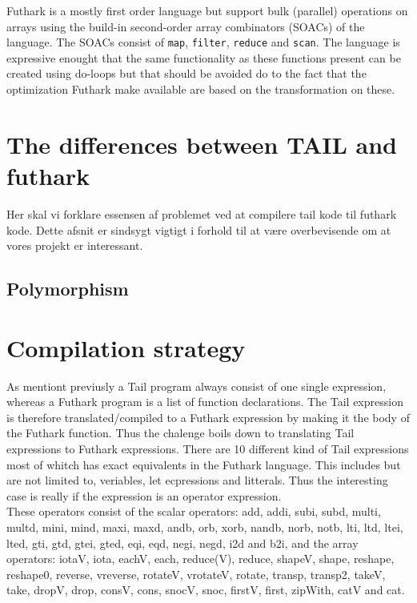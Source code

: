 \documentclass[11pt]{article}
\begin{document}
Futhark is a mostly first order language but support bulk (parallel) operations on arrays using the build-in second-order array combinators (SOACs) of the language. The SOACs consist of {\tt map}, {\tt filter}, {\tt reduce} and {\tt scan}. The language is expressive enought that the same functionality as these functions present can be created using do-loops but that should be avoided do to the fact that the optimization Futhark make available are based on the transformation on these.



\section{The differences between TAIL and futhark}

Her skal vi forklare essensen af problemet ved at compilere tail kode til futhark kode. Dette afsnit er sindsygt vigtigt i forhold til at være overbevisende om at vores projekt er interessant. 

\subsection{Polymorphism}

\section{Compilation strategy}
As mentiont previusly a Tail program always consist of one single expression, whereas a Futhark program is a list of function declarations. The Tail expression is therefore translated/compiled to a Futhark expression by making it the body of the Futhark function. 
Thus the chalenge boils down to translating Tail expressions to Futhark expressions. 
There are 10 different kind of Tail expressions most of whitch has exact equivalents in the Futhark language. This includes but are not limited to, veriables, let ecpressions and litterals. Thus the interesting case is really if the expression is an operator expression. \\

These operators consist of the scalar operators: add, addi, subi, subd, multi, multd, mini, mind, maxi, maxd, andb, orb, xorb, nandb, norb, notb, lti, ltd, ltei, lted, gti, gtd, gtei, gted, eqi, eqd, negi, negd, i2d and b2i, and the array operators: iotaV, iota, eachV, each, reduce(V), reduce, shapeV, shape, reshape, reshape0, reverse, vreverse, rotateV, vrotateV, rotate, transp, transp2, takeV, take, dropV, drop, consV, cons, snocV, snoc, firstV, first, zipWith, catV and cat. \\
\end{document}
